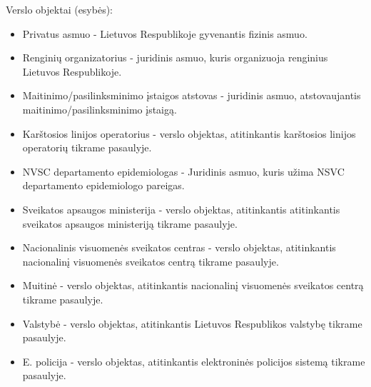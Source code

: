 \documentclass{VUMIFPSkursinis}
\begin{document}
Verslo objektai (esybės):
\begin{itemize}
	\item Privatus asmuo - Lietuvos Respublikoje gyvenantis fizinis asmuo.
	\item Renginių organizatorius - juridinis asmuo, kuris organizuoja renginius Lietuvos Respublikoje.
	\item Maitinimo/pasilinksminimo įstaigos atstovas - juridinis asmuo, atstovaujantis maitinimo/pasilinksminimo įstaigą.
	\item Karštosios linijos operatorius - verslo objektas, atitinkantis karštosios linijos operatorių tikrame pasaulyje.
	\item NVSC departamento epidemiologas - Juridinis asmuo, kuris užima NSVC departamento epidemiologo pareigas.
	\item Sveikatos apsaugos ministerija - verslo objektas, atitinkantis atitinkantis sveikatos apsaugos ministeriją tikrame pasaulyje.
	\item Nacionalinis visuomenės sveikatos centras - verslo objektas, atitinkantis nacionalinį visuomenės sveikatos centrą tikrame pasaulyje.
	\item Muitinė - verslo objektas, atitinkantis nacionalinį visuomenės sveikatos centrą tikrame pasaulyje.
	\item Valstybė - verslo objektas, atitinkantis Lietuvos Respublikos valstybę tikrame pasaulyje.
	\item E. policija - verslo objektas, atitinkantis elektroninės policijos sistemą tikrame pasaulyje.
\end{itemize}
\end{document}
